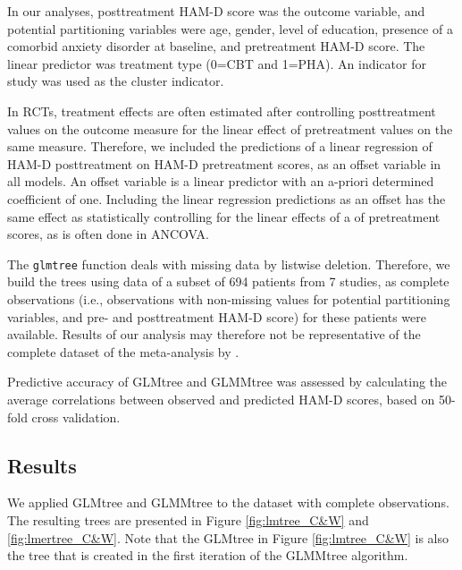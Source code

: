 \documentclass[nobf,doc]{apa}
\begin{document}
In our analyses, posttreatment HAM-D score was the outcome variable, and potential partitioning variables were age, gender, level of education, presence of a comorbid anxiety disorder at baseline, and pretreatment HAM-D score. The linear predictor was treatment type (0=CBT and 1=PHA). An indicator for study was used as the cluster indicator. 

In RCTs, treatment effects are often estimated after controlling posttreatment values on the outcome measure for the linear effect of pretreatment values on the same measure. Therefore, we included the predictions of a linear regression of HAM-D posttreatment on HAM-D pretreatment scores, as an offset variable in all models. An offset variable is a linear predictor with an a-priori determined coefficient of one. Including the linear regression predictions as an offset has the same effect as statistically controlling for the linear effects of a of pretreatment scores, as is often done in ANCOVA. 

The \verb|glmtree| function deals with missing data by listwise deletion. Therefore, we build the trees using data of a subset of 694 patients from 7 studies, as complete observations (i.e., observations with non-missing values for potential partitioning variables, and pre- and posttreatment HAM-D score) for these patients were available. Results of our analysis may therefore not be representative of the complete dataset of the meta-analysis by \cite{CuijyWeit14}. 

Predictive accuracy of GLMtree and GLMMtree was assessed by calculating the average correlations between observed and predicted HAM-D scores, based on 50-fold cross validation.

\subsection{Results}

We applied GLMtree and GLMMtree to the dataset with complete observations. The resulting trees are presented in Figure \ref{fig:lmtree_C&W} and \ref{fig:lmertree_C&W}. Note that the GLMtree in Figure \ref{fig:lmtree_C&W} is also the tree that is created in the first iteration of the GLMMtree algorithm. 
\end{document}
